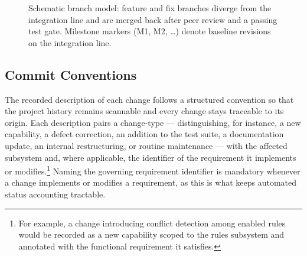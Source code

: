 \begin{figure}[H]
\centering
{}
\caption{Schematic branch model: feature and fix branches diverge from the
         integration line and are merged back after peer review and a passing test
         gate. Milestone markers (M1, M2, \ldots) denote baseline revisions on the
         integration line.}
\label{fig:branch-tikz}
\end{figure}

\subsection{Commit Conventions}

The recorded description of each change follows a structured convention so that the
project history remains scannable and every change stays traceable to its origin.
Each description pairs a change-type --- distinguishing, for instance, a new
capability, a defect correction, an addition to the test suite, a documentation
update, an internal restructuring, or routine maintenance --- with the affected
subsystem and, where applicable, the identifier of the requirement it implements or
modifies.\footnote{For example, a change introducing conflict detection among
enabled rules would be recorded as a new capability scoped to the rules subsystem and
annotated with the functional requirement it satisfies.} Naming the governing
requirement identifier is mandatory whenever a change implements or modifies a
requirement, as this is what keeps automated status accounting tractable.


